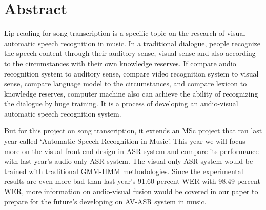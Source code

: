 \chapter*{\Large \center Abstract}

Lip-reading for song transcription is a specific topic on the research of visual automatic speech recognition in music. In a traditional dialogue, people recognize the speech content through their auditory sense, visual sense and also according to the circumstances with their own knowledge reserves. If compare audio recognition system to auditory sense, compare video recognition system to visual sense, compare language model to the circumstances, and compare lexicon to knowledge reserves, computer machine also can achieve the ability of recognizing the dialogue by huge training. It is a process of developing an audio-visual automatic speech recognition system. 

But for this project on song transcription, it extends an MSc project that ran last year called ‘Automatic Speech Recognition in Music’\cite{Reference1}. This year we will focus more on the visual front end design in ASR system and compare its performance with last year's audio-only ASR system. The visual-only ASR system would be trained with  traditional GMM-HMM methodologies. Since the experimental results are even more bad than last year's 91.60 percent WER with 98.49 percent WER,  more information on audio-visual fusion would be covered in our paper to prepare for the future's developing on AV-ASR system in music.

